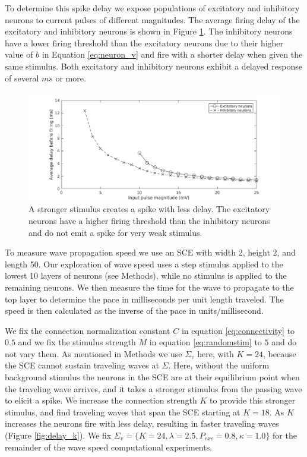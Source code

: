 \documentclass[12pt]{article}
\begin{document}
To determine this spike delay we expose populations of excitatory and inhibitory neurons to current pulses of different magnitudes.
The average firing delay of the excitatory and inhibitory neurons is shown in Figure \ref{fig:delay_neurondynamics}.
The inhibitory neurons have a lower firing threshold than the excitatory neurons \color{red}due to their higher value of $b$ in Equation \ref{eq:neuron_v} \color{black} \parencite{izhikevich2003} and fire with a shorter delay when given the same stimulus.
Both excitatory and inhibitory neurons exhibit a delayed response of several $ms$ or more.
\begin{figure}[!htb]
 \caption{ A stronger stimulus creates a spike with less delay. The excitatory neurons have a higher firing threshold than the inhibitory neurons and do not emit a spike for very weak stimulus.}
 \label{fig:delay_neurondynamics}
 \centering
   \includegraphics[width=\textwidth]{fig/WaveSpeed_NeuronDynamics}
\end{figure}

\FloatBarrier

To measure wave propagation speed we use an SCE with width 2, height 2, and length 50.
Our exploration of wave speed uses a step stimulus applied to the lowest 10 layers of neurons (see Methods), while no stimulus is applied to the remaining neurons.
We then measure the time for the wave to propagate to the top layer to determine the pace in milliseconds per unit length traveled.
The speed is then calculated as the inverse of the pace in units/millisecond.

We fix the connection normalization constant $C$ in equation \ref{eq:connectivity} to $0.5$ and we fix the stimulus strength $M$ in equation \ref{eq:randomstim} to $5$ and do not vary them.
As mentioned in Methods we use $\Sigma_v$ here, with $K=24$, because the SCE cannot sustain traveling waves at $\Sigma$. 
Here, without the uniform background stimulus the neurons in the SCE are at their equilibrium point when the traveling wave arrives, and it takes a stronger stimulus from the passing wave to elicit a spike.
We increase the connection strength $K$ to provide this stronger stimulus, and find traveling waves that span the SCE starting at $K=18$. 
As $K$ increases the neurons fire with less delay, resulting in faster traveling waves (Figure \ref{fig:delay_k}).
We fix $\Sigma_v = \{K=24,\lambda=2.5,P_{exc}=0.8,\kappa=1.0 \}$ for the remainder of the wave speed computational experiments.
\end{document}
